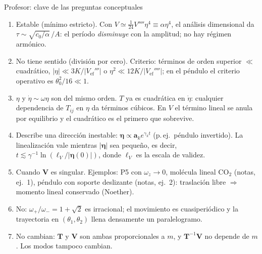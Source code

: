 \documentclass[spanish]{beamer}
\newcommand{\Tm}{\mathbf{T}}              %
\newcommand{\Vm}{\mathbf{V}}              %
\newcommand{\bfeta}{\boldsymbol{\eta}}    %
\newcommand{\ba}{\boldsymbol{a}}          %
\newcommand{\Vef}{V_{\mathrm{ef}}}
\begin{document}
\begin{frame}{Profesor: clave de las preguntas conceptuales}
\scriptsize
\begin{enumerate}
\item Estable (mínimo estricto). Con $V\simeq\tfrac{1}{24}V''''\eta^4\equiv\alpha\eta^4$, el análisis dimensional da $\tau\sim\sqrt{c_0/\alpha}\,/A$: el período \emph{disminuye} con la amplitud; no hay régimen armónico.
\item No tiene sentido (división por cero). Criterio: términos de orden superior $\ll$ cuadrático, $|\eta|\ll3K/|\Vef'''|$ o $\eta^2\ll12K/|\Vef''''|$; en el péndulo el criterio operativo es $\theta_0^2/16\ll1$.
\item $\eta$ y $\dot\eta\sim\omega\eta$ son del mismo orden. $T$ ya es cuadrática en $\dot\eta$: cualquier dependencia de $T_{ij}$ en $\eta$ da términos cúbicos. En $V$ el término lineal se anula por equilibrio y el cuadrático es el primero que sobrevive.
\item Describe una dirección inestable: $\bfeta\propto\ba_k e^{\gamma_kt}$ (p.\,ej.\ péndulo invertido). La linealización vale mientras $|\bfeta|$ sea pequeño, es decir, $t\lesssim\gamma^{-1}\ln(\ell_V/|\bfeta(0)|)$, donde $\ell_V$ es la escala de validez.
\item Cuando $\Vm$ es singular. Ejemplos: P5 con $\omega_z\to0$, molécula lineal CO$_2$ (notas, ej.~1), péndulo con soporte deslizante (notas, ej.~2): traslación libre $\Rightarrow$ momento lineal conservado (Noether).
\item No: $\omega_+/\omega_-=1+\sqrt2$ es irracional; el movimiento es cuasiperiódico y la trayectoria en $(\theta_1,\theta_2)$ llena densamente un paralelogramo.
\item No cambian: $\Tm$ y $\Vm$ son ambas proporcionales a $m$, y $\Tm^{-1}\Vm$ no depende de $m$. Los modos tampoco cambian.
\end{enumerate}
\end{frame}
\end{document}
